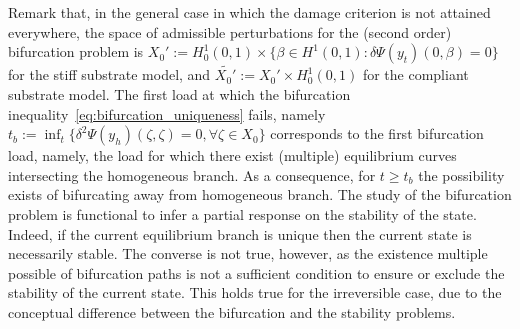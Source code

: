 Remark that, in the general case in which the damage criterion is not attained everywhere, the space of admissible perturbations for the (second order) bifurcation problem is $X_0':=H^1_0(0, 1) \times \{ \beta \in H^1(0, 1) : \delta\Psi(y_t)(0, \beta) = 0 \}$ for the stiff substrate model, and $\widetilde{X_0'}:=X_0'\times H^1_0(0,1)$ for the compliant substrate model. 
The first load at which the bifurcation inequality~\eqref{eq:bifurcation_uniqueness} fails, namely $t_b:=\inf_t \{\delta^2 \Psi(y_h)(\zeta, \zeta) =0, \forall \zeta \in X_0 \}$ corresponds to the first  bifurcation load, namely, the load for which there exist (multiple) equilibrium curves intersecting the homogeneous branch. As a consequence, for $t\geq t_b$  the possibility exists of bifurcating away from homogeneous branch. The study of the bifurcation problem is functional to infer a partial response on the stability of the state. Indeed, if the current equilibrium branch is unique then the current state is necessarily stable. The converse is not true, however, as the existence multiple possible of bifurcation paths is not a sufficient condition to ensure or exclude the stability of the current state. This holds true for the irreversible case, due to the conceptual difference between the bifurcation and the stability problems.


